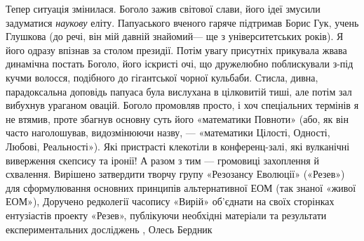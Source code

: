 Тепер ситуація змінилася. Боголо зажив світової слави, його ідеї змусили
задуматися \emph{наукову} еліту. Папуаського вченого гаряче підтримав Борис Гук, учень
Глушкова (до речі, він мій давній знайомий— ще з університетських років). Я
його одразу впізнав за столом президії. Потім увагу присутніх прикувала жвава
динамічна постать Боголо, його іскристі очі, що дружелюбно поблискували з-під
кучми волосся, подібного до гігантської чорної кульбаби.  Стисла, дивна,
парадоксальна доповідь папуаса була вислухана в цілковитій тиші, але потім зал
вибухнув ураганом овацій. Боголо промовляв просто, і хоч спеціальних термінів я
не втямив, проте збагнув основну суть його «математики Повноти» (або, як він
часто наголошував, видозмінюючи назву, — «математики Цілості, Одності, Любові,
Реальності»).  Які пристрасті клекотіли в конференц-залі, які вулканічні
виверження скепсису та іронії! А разом з тим — громовиці захоплення й
схвалення.  Вирішено затвердити творчу групу «Резозансу Еволюції» («Резев») для
сформулювання основних принципів альтернативної ЕОМ (так знаної «живої ЕОМ»),
Доручено редколегії часопису «Вирій» об’єднати на своїх сторінках ентузіастів
проекту «Резев», публікуючи необхідні матеріали та результати експериментальних
досліджень
, Олесь Бердник
